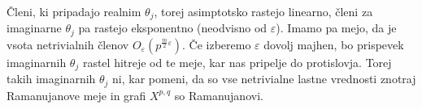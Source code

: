 Členi, ki pripadajo realnim \(\theta_j\), torej asimptotsko rastejo linearno, členi za imaginarne \(\theta_j\) pa rastejo eksponentno (neodvisno od \(\varepsilon\)). Imamo pa mejo, da je vsota netrivialnih členov \(O_\varepsilon\left(p^{\frac{m}{2}\varepsilon}\right)\). Če izberemo \(\varepsilon\) dovolj majhen, bo prispevek imaginarnih \(\theta_j\) rastel hitreje od te meje, kar nas pripelje do protislovja. Torej takih imaginarnih \(\theta_j\) ni, kar pomeni, da so vse netrivialne lastne vrednosti znotraj Ramanujanove meje in grafi \(X^{p,q}\) so Ramanujanovi.